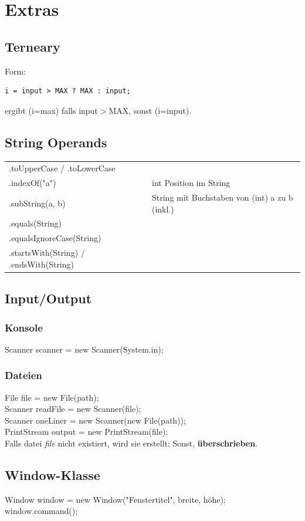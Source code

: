 \documentclass[12pt,a4paper]{article}
\begin{document}
\section{Extras}
\subsection{Terneary}
Form:\\
\begin{verbatim}
i = input > MAX ? MAX : input;
\end{verbatim}
ergibt (i=max) falls input$>$MAX, sonst (i=input).
\subsection{String Operands}
\begin{tabularx}{\linewidth}{l X}
.toUpperCase / .toLowerCase\\
.indexOf("a") & int Position im String\\
.subString(a, b) & String mit Buchstaben von (int) a zu b (inkl.)\\
.equals(String)\\
.equalsIgnoreCase(String)\\
.startsWith(String) / .endsWith(String)
\end{tabularx}
\subsection{Input/Output}
\subsubsection{Konsole}
Scanner scanner = new Scanner(System.in);
\subsubsection{Dateien}
File file = new File(path);\\
Scanner readFile = new Scanner(file);\\
Scanner oneLiner = new Scanner(new File(path));\\
PrintStream output = new PrintStream(file);\\
\hspace*{1cm} Falls datei \textit{file} nicht existiert, wird sie erstellt; Sonst, \textbf{überschrieben}.
\newpage
\subsection{Window-Klasse}
Window window = new Window("Fenstertitel", breite, höhe);\\
window.command();\\\\
\end{document}

